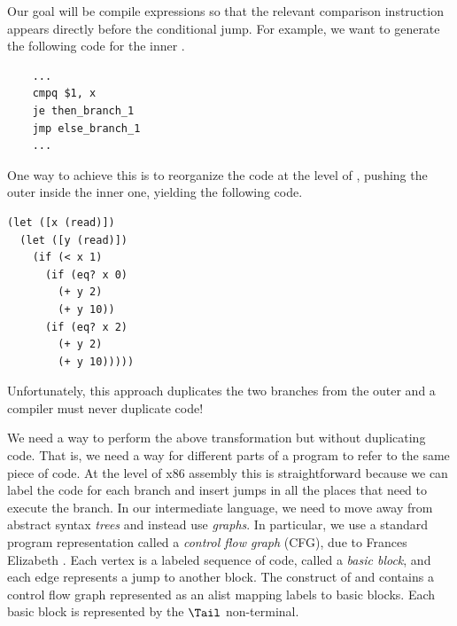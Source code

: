 \documentclass[11pt]{book}
\begin{document}
Our goal will be compile  expressions so that the relevant
comparison instruction appears directly before the conditional jump.
For example, we want to generate the following code for the inner
.
\begin{center}
\begin{minipage}{0.96\textwidth}
\begin{lstlisting}
    ...
    cmpq $1, x
    je then_branch_1
    jmp else_branch_1
    ...
\end{lstlisting}
\end{minipage}
\end{center}
One way to achieve this is to reorganize the code at the level of
\LangIf{}, pushing the outer  inside the inner one, yielding
the following code.
\begin{center}
\begin{minipage}{0.96\textwidth}
\begin{lstlisting}
(let ([x (read)])
  (let ([y (read)])
    (if (< x 1) 
      (if (eq? x 0)
        (+ y 2)
        (+ y 10))
      (if (eq? x 2)
        (+ y 2)
        (+ y 10)))))
\end{lstlisting}
\end{minipage}
\end{center}
Unfortunately, this approach duplicates the two branches from the
outer  and a compiler must never duplicate code!

We need a way to perform the above transformation but without
duplicating code. That is, we need a way for different parts of a
program to refer to the same piece of code. At the level of x86
assembly this is straightforward because we can label the code for
each branch and insert jumps in all the places that need to execute
the branch. In our intermediate language, we need to move away from
abstract syntax \emph{trees} and instead use \emph{graphs}. In
particular, we use a standard program representation called a
\emph{control flow graph} (CFG), due to Frances Elizabeth
\citet{Allen:1970uq}.   Each vertex is a
labeled sequence of code, called a \emph{basic block}, and each edge
represents a jump to another block. The  construct of
\LangCVar{} and \LangCIf{} contains a control flow graph represented
as an alist mapping labels to basic blocks. Each basic block is
represented by the $\Tail$ non-terminal.
\end{document}

